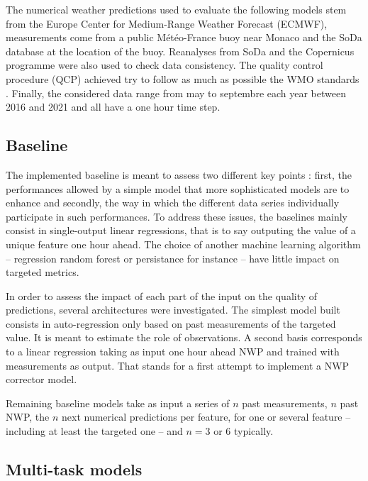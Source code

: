 \documentclass{article}
\newcommand{\saut}{\vspace{10px}}
\begin{document}
\saut

The numerical weather predictions used to evaluate the following models 
stem from the Europe Center for Medium-Range Weather Forecast (ECMWF), measurements come from a public
Météo-France buoy near Monaco and the SoDa database at the location of the buoy. Reanalyses from SoDa and
the Copernicus programme were also used to check data consistency. The quality control procedure (QCP) achieved
try to follow as much as possible the WMO standards \cite{organization_wmo_guidelines_2021}. Finally,
the considered data range from may to septembre each year between 2016 and 2021 and all have a one hour
time step.


\subsection*{Baseline}

The implemented baseline is meant to assess two different key points : first, the performances allowed by a simple
model that more sophisticated models are to enhance and secondly, the way in which the different data
series individually participate in such performances. To address these issues, the baselines mainly consist in single-output
linear regressions, that is to say outputing the value of a unique feature one hour ahead.
The choice of another machine learning algorithm -- regression random forest or persistance for instance -- have little
impact on targeted metrics.

\saut

In order to assess the impact of each part of the input on the quality of predictions, several architectures were investigated.
The simplest model built consists in auto-regression only based on past measurements of the targeted value.
It is meant to estimate the role of observations. A second basis corresponds to a linear regression taking as input
one hour ahead NWP and trained with measurements as output. That stands for a first attempt to implement a
NWP corrector model.

\saut

Remaining baseline models take as input a series of $n$ past measurements, $n$ past NWP, the $n$ next
numerical predictions per feature, for one or several feature -- including at least the targeted one -- and $n = 3$ or
$6$ typically.

\subsection*{Multi-task models}
\end{document}
